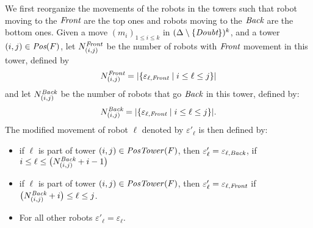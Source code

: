  We first reorganize the movements of the robots in the towers such that 
 robot moving to the $\textit{Front}$ are the top ones and robots moving to 
 the $\textit{Back}$ are the bottom ones.
 Given a move $(m_i)_{1\leq i \leq k}$ in $(\Delta \setminus \{\textit{Doubt}\})^k$, and a tower $(i, j)\in\textit{Pos}(F)$, 
 let $N^{\textit{Front}}_{(i, j)}$ be the number of robots with $\textit{Front}$ movement in this tower, 
 defined by $$N^{\textit{Front}}_{(i, j)}=|\{\varepsilon_{\ell, \textit{Front}} \mid i\leq \ell \leq j\}|$$ and let  
$N^{\textit{Back}}_{(i, j)}$ be the number of robots that go $\textit{Back}$ in this tower, defined by:  
$$N^{\textit{Back}}_{(i, j)}=|\{\varepsilon_{\ell, \textit{Front}} \mid i\leq \ell \leq j\}|.$$ 
The modified movement of robot $\ell$ denoted by $\varepsilon'_\ell$ is then defined by:  
\begin{itemize}
 \item if $\ell$ is part of tower $(i, j)\in\mathit{PosTower}(F)$, then $\varepsilon'_\ell=\varepsilon_{\ell, \textit{Back}}$, if $i\leq \ell \leq \bigl(N_{(i, j)}^{\textit{Back}} +i-1\bigr)$
 \item if $\ell$ is part of tower $(i, j)\in\mathit{PosTower}(F)$, then $\varepsilon'_\ell = \varepsilon_{\ell, \textit{Front}}$ if $\bigl(N_{(i, j)}^{\textit{Back}} +i\bigr)\leq \ell \leq j$. 
 \item For all other robots $\varepsilon'_\ell=\varepsilon_\ell$. 
 \end{itemize}
 
